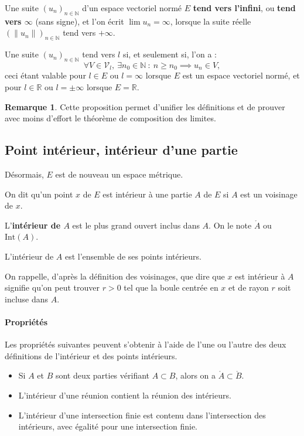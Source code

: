 \documentclass[french]{article}
\newcommand{\N}{\mathbb{N}}
\newcommand{\R}{\mathbb{R}}
\theoremstyle{plain}
\theoremstyle{definition}
\newtheorem*{rmq}{Remarque}
\theoremstyle{remark}
\begin{document}
\begin{dfn}
	Une suite $(u_n)_{n\in\N}$ d'un espace vectoriel normé $E$ \textbf{tend vers l'infini}, ou \textbf{tend vers $\infty$} (sans signe), et l'on écrit $\lim u_n=\infty$, lorsque la suite réelle $(\lVert u_n\rVert)_{n\in\N}$ tend vers $+\infty$.
\end{dfn}

\begin{prop}%
	Une suite $(u_n)_{n\in\N}$ tend vers $l$ si, et seulement si, l'on a : $$\forall V\in\mathcal{V}_l,\ \exists n_0\in\N\ : \ n\geqslant n_0\implies u_n\in V,$$ ceci étant valable pour $l\in E$ ou $l=\infty$ lorsque $E$ est un espace vectoriel normé, et pour $l\in\R$ ou $l=\pm\infty$ lorsque $E=\R$.
\end{prop}

\begin{rmq}
	Cette proposition permet d'unifier les définitions et de prouver avec moins d'effort le théorème de composition des limites.
\end{rmq}

\subsection{Point intérieur, intérieur d'une partie}

Désormais, $E$ est de nouveau un espace métrique.

\begin{dfn}
	On dit qu'un point $x$ de $E$ est intérieur à une partie $A$ de $E$ si $A$ est un voisinage de $x$.
\end{dfn}

\begin{dfn}
	L'\textbf{intérieur de $A$} est le plus grand ouvert inclus dans $A$. On le note $\mathring{A}$ ou $\text{Int}(A)$.
\end{dfn}

\begin{prop}
	L'intérieur de $A$ est l'ensemble de ses points intérieurs.
\end{prop}

On rappelle, d'après la définition des voisinages, que dire que $x$ est intérieur à $A$ signifie qu'on peut trouver $r>0$ tel que la boule centrée en $x$ et de rayon $r$ soit incluse dans $A$.

\paragraph{Propriétés} Les propriétés suivantes peuvent s'obtenir à l'aide de l'une ou l'autre des deux définitions de l'intérieur et des points intérieurs.
\begin{itemize}
	\item Si $A$ et $B$ sont deux parties vérifiant $A\subset B$, alors on a $\mathring{A}\subset\mathring{B}$.
	\item L'intérieur d'une réunion contient la réunion des intérieurs.
	\item L'intérieur d'une intersection finie est contenu dans l'intersection des intérieurs, avec égalité pour une intersection finie.
\end{itemize}
\end{document}

